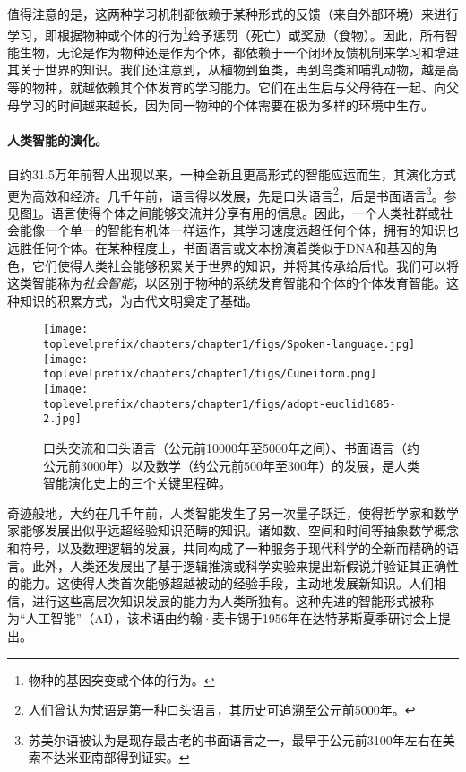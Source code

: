 \documentclass[../../book-main_zh.tex]{subfiles}
\begin{document}
值得注意的是，这两种学习机制都依赖于某种形式的反馈（来自外部环境）来进行学习，即根据物种或个体的行为\footnote{物种的基因突变或个体的行为。}给予惩罚（死亡）或奖励（食物）。因此，所有智能生物，无论是作为物种还是作为个体，都依赖于一个闭环反馈机制来学习和增进其关于世界的知识。我们还注意到，从植物到鱼类，再到鸟类和哺乳动物，越是高等的物种，就越依赖其个体发育的学习能力。它们在出生后与父母待在一起、向父母学习的时间越来越长，因为同一物种的个体需要在极为多样的环境中生存。

\paragraph{人类智能的演化。}

自约31.5万年前智人出现以来，一种全新且更高形式的智能应运而生，其演化方式更为高效和经济。几千年前，语言得以发展，先是口头语言\footnote{人们曾认为梵语是第一种口头语言，其历史可追溯至公元前5000年。}，后是书面语言\footnote{苏美尔语被认为是现存最古老的书面语言之一，最早于公元前3100年左右在美索不达米亚南部得到证实。}。参见图\ref{fig:human-intelligence}。语言使得个体之间能够交流并分享有用的信息。因此，一个人类社群或社会能像一个单一的智能有机体一样运作，其学习速度远超任何个体，拥有的知识也远胜任何个体。在某种程度上，书面语言或文本扮演着类似于DNA和基因的角色，它们使得人类社会能够积累关于世界的知识，并将其传承给后代。我们可以将这类智能称为{\em 社会智能}，以区别于物种的系统发育智能和个体的个体发育智能。这种知识的积累方式，为古代文明奠定了基础。
\begin{figure}
    \centering
    \texttt{[image: \\toplevelprefix/chapters/chapter1/figs/Spoken-language.jpg]}
   \hspace{5mm} \texttt{[image: \\toplevelprefix/chapters/chapter1/figs/Cuneiform.png]}
   \hspace{5mm} \texttt{[image: \\toplevelprefix/chapters/chapter1/figs/adopt-euclid1685-2.jpg]}
    \caption{口头交流和口头语言（公元前10000年至5000年之间）、书面语言（约公元前3000年）以及数学（约公元前500年至300年）的发展，是人类智能演化史上的三个关键里程碑。}
    \label{fig:human-intelligence}
\end{figure}

奇迹般地，大约在几千年前，人类智能发生了另一次量子跃迁，使得哲学家和数学家能够发展出似乎远超经验知识范畴的知识。诸如数、空间和时间等抽象数学概念和符号，以及数理逻辑的发展，共同构成了一种服务于现代科学的全新而精确的语言。此外，人类还发展出了基于逻辑推演或科学实验来提出新假说并验证其正确性的能力。这使得人类首次能够超越被动的经验手段，主动地发展新知识。人们相信，进行这些高层次知识发展的能力为人类所独有。这种先进的智能形式被称为“人工智能”（AI），该术语由约翰·麦卡锡于1956年在达特茅斯夏季研讨会上提出。
\end{document}
